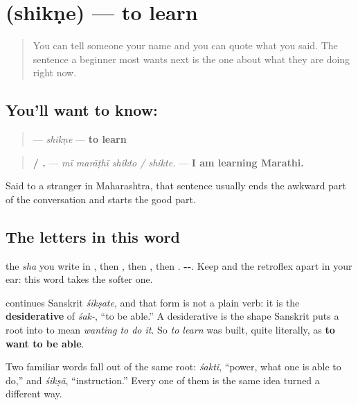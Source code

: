\section[\texorpdfstring{\mr{शिकणे} (shikṇe)}{शिकणे (shikṇe)}]{ (shikṇe) — to learn}

\label{lesson:MR-C24-shikne}



\begin{quote}
You can tell someone your name and you can quote what you said. The sentence a beginner most wants next is the one about what they are doing right now.
\end{quote}

\subsection*{You'll want to know: }
\begin{quote}
\textbf{} — \emph{shikṇe} — \textbf{to learn}
\end{quote}

\begin{quote}
\textbf{   / .} — \emph{mī marāṭhī shikto / shikte.} — \textbf{I am learning Marathi.}
\end{quote}

Said to a stranger in Maharashtra, that sentence usually ends the awkward part of the conversation and starts the good part.

\subsection*{The letters in this word}
\textbf{} the \emph{sha} you write in \textbf{}, then \textbf{}, then \textbf{}, then \textbf{}. \textbf{--}. Keep \textbf{} and the retroflex \textbf{} apart in your ear: this word takes the softer one.

\begin{cousinweb}
\textbf{} continues Sanskrit \textbf{} \emph{śikṣate}, and that form is not a plain verb: it is the \textbf{desiderative} of \textbf{} \emph{śak-}, \textquotedblleft{}to be able.\textquotedblright{} A desiderative is the shape Sanskrit puts a root into to mean \emph{wanting to do it}. So \emph{to learn} was built, quite literally, as \textbf{to want to be able}.

Two familiar words fall out of the same root: \textbf{} \emph{śakti}, \textquotedblleft{}power, what one is able to do,\textquotedblright{} and \textbf{} \emph{śikṣā}, \textquotedblleft{}instruction.\textquotedblright{} Every one of them is the same idea turned a different way.
\end{cousinweb}

